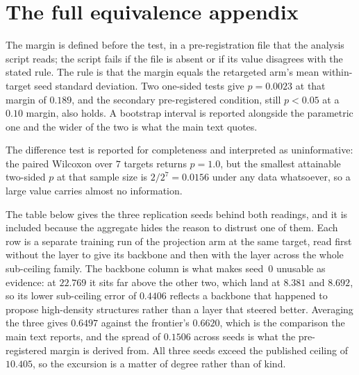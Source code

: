 \section{The full equivalence appendix}
\label{si:equivalence}

The margin is defined before the test, in a pre-registration file that the analysis
script reads; the script fails if the file is absent or if its value disagrees with the
stated rule. The rule is that the margin equals the retargeted arm's mean within-target
seed standard deviation. Two one-sided tests give $p = 0.0023$ at that margin of
$0.189$, and the secondary pre-registered condition, still $p < 0.05$ at a $0.10$
margin, also holds. A bootstrap interval is reported alongside the parametric one and
the wider of the two is what the main text quotes.

The difference test is reported for completeness and interpreted as uninformative: the
paired Wilcoxon over $7$ targets returns $p = 1.0$, but the smallest attainable
two-sided $p$ at that sample size is $2/2^{7} = 0.0156$ under any data whatsoever, so a
large value carries almost no information.

The table below gives the three replication seeds behind both readings, and it is
included because the aggregate hides the reason to distrust one of them. Each row is a
separate training run of the projection arm at the same target, read first without the layer
to give its backbone and then with the layer across the whole sub-ceiling family. The
backbone column is what makes seed~0 unusable as evidence: at
$22.769$ it sits far above the other two, which land at
$8.381$ and $8.692$, so its lower
sub-ceiling error of $0.4406$ reflects a backbone that happened
to propose high-density structures rather than a layer that steered better. Averaging the
three gives $0.6497$ against the frontier's
$0.6620$, which is the comparison the main text reports, and
the spread of $0.1506$ across seeds is what the pre-registered
margin is derived from. All three seeds exceed the published ceiling of
$10.405$, so the excursion is a matter of degree rather than of kind.

